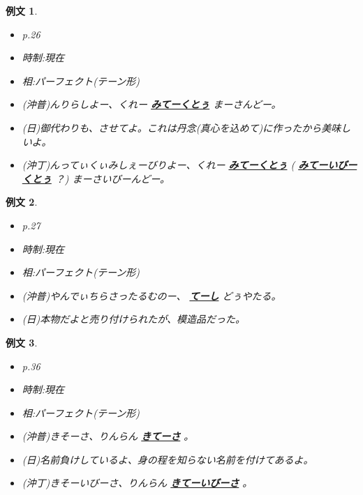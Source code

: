 \documentclass[a4j,12pt]{jarticle}
\theoremstyle{break}
\newtheorem{example}{例文}
\newcommand{\highlight}[1]{
  \textbf{\underline{#1}}
}
\begin{document}
\begin{example}
  \begin{itemize}
  \item p.26
  \item 時制:現在
  \item 相:パーフェクト(テーン形)
  \item (沖普)んりらしよー、くれー\highlight{みてーくとぅ} まーさんどー。
  \item (日)御代わりも、させてよ。これは丹念(真心を込めて)に作ったから美味しいよ。
  \item (沖丁)んってぃくぃみしぇーびりよー、くれー\highlight{みてーくとぅ}(\highlight{\ruby{込}{く}みてーいびーくとぅ}？) まーさいびーんどー。
  \end{itemize}
\end{example}
\begin{example}
  \begin{itemize}
  \item p.27
  \item 時制:現在
  \item 相:パーフェクト(テーン形)
  \item (沖普)やんでぃちらさったるむのー、\highlight{てーし} どぅやたる。
  \item (日)本物だよと売り付けられたが、模造品だった。
  \end{itemize}
\end{example}
\begin{example}
  \begin{itemize}
  \item p.36
  \item 時制:現在
  \item 相:パーフェクト(テーン形)
  \item (沖普)きそーさ、りんらん\highlight{きてーさ}。 
  \item (日)名前負けしているよ、身の程を知らない名前を付けてあるよ。
  \item (沖丁)きそーいびーさ、りんらん\highlight{きてーいびーさ}。 
  \end{itemize}
\end{example}
\end{document}
